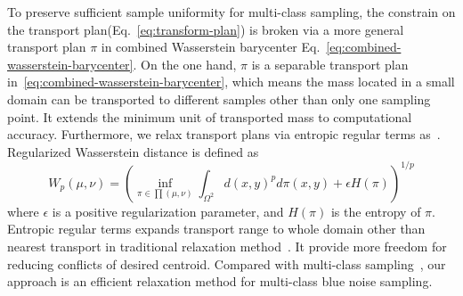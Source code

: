To preserve sufficient sample uniformity for multi-class sampling,
the constrain on the transport plan(Eq.~\ref{eq:transform-plan})
is broken via a more general transport plan $\pi$ in combined Wasserstein barycenter Eq.~\ref{eq:combined-wasserstein-barycenter}.
On the one hand,
$\pi$ is a separable transport plan in~\ref{eq:combined-wasserstein-barycenter},
which means the mass located in a small domain can be transported to different samples other than only one sampling point.
It extends the minimum unit of transported mass to computational accuracy.
Furthermore,
we relax transport plans via entropic regular terms as~\cite{cuturi:2013:sinkhorn}.
Regularized Wasserstein distance is defined as
\begin{equation}\label{eq:regulate-wasserstein-distance}
 W_p(\mu,\nu)=\left(\inf\limits_{\pi\in\prod(\mu,\nu)}\int_{\Omega^2}d(x,y)^pd\pi(x,y)+\epsilon H(\pi)\right )^{1/p}
\end{equation}
where $\epsilon$ is a positive regularization parameter,
and $H(\pi)$ is the entropy of $\pi$.
Entropic regular terms expands transport range to whole domain other than nearest transport in traditional relaxation method~\cite{balzer:2009:capacity}.
It provide more freedom for reducing conflicts of desired centroid.
Compared with multi-class sampling~\cite{wei:2010:multi},
our approach is an efficient relaxation method for multi-class blue noise sampling.






